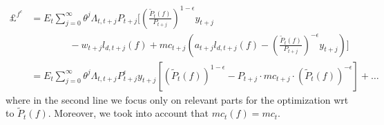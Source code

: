\begin{enumerate}
\begingroup\vspace{-1\baselineskip}\small
\begin{align}
\pounds^{f^c} &= E_t \sum_{j=0}^{\infty}\theta^j \Lambda_{t,t+j} P_{t+j}
\Bigg[
  {\left(\frac{\widetilde{P}_{t}(f)}{P_{t+j}}\right)}^{1-\epsilon} y_{t+j}
\nonumber
\\
&\qquad\qquad
- w_{t+j} l_{d,t+j}(f) + mc_{t+j}\left(a_{t+j} l_{d,t+j}(f) - {\left(\frac{\widetilde{P}_{t}(f)}{P_{t+j}}\right)}^{-\epsilon} y_{t+j}\right)
\Bigg]
\nonumber
\\
&= E_t \sum_{j=0}^{\infty}\theta^j \Lambda_{t,t+j} P_{t+j}^\epsilon y_{t+j} \left[ {(\widetilde{P}_{t}(f))}^{1-\epsilon}  - P_{t+j} \cdot mc_{t+j} \cdot {(\widetilde{P}_{t}(f))}^{-\epsilon} \right] + \ldots
\label{eq:Firms.Lagrangian.Calvo}
\end{align}
\endgroup
where in the second line we focus only on relevant parts for the optimization wrt to \(\widetilde{P}_t(f)\).
Moreover, we took into account that \(mc_t(f) = mc_t\).
		

\end{enumerate}

